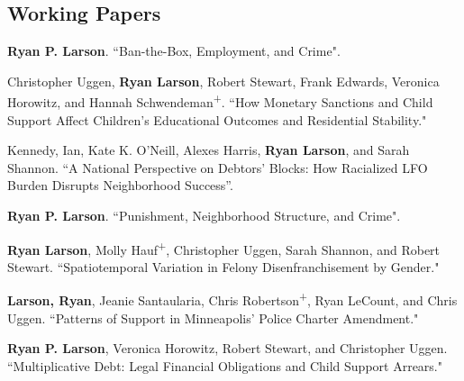 \documentclass[letterpaper]{article}
\newenvironment{publist}{%
  \begin{list}{}{%
    \setlength{\leftmargin}{0cm}   %
    \setlength{\labelwidth}{2cm}     %
    \setlength{\labelsep}{0.5cm}     %
  }%
}{%
  \end{list}%
}
\begin{document}
\subsection*{Working Papers}
\begin{publist}

\item \textbf{Ryan P. Larson}. ``Ban-the-Box, Employment, and Crime". 

\item Christopher Uggen, \textbf{Ryan Larson}, Robert Stewart, Frank Edwards, Veronica Horowitz, and Hannah Schwendeman\textsuperscript{+}. ``How Monetary Sanctions and Child Support Affect Children's Educational Outcomes and Residential Stability."

\item Kennedy, Ian, Kate K. O’Neill, Alexes Harris, \textbf{Ryan Larson}, and Sarah Shannon. “A National Perspective on Debtors’ Blocks: How Racialized LFO Burden Disrupts Neighborhood Success”.

\item \textbf{Ryan P. Larson}. ``Punishment, Neighborhood Structure, and Crime".

\item \textbf{Ryan Larson}, Molly Hauf\textsuperscript{+}, Christopher Uggen, Sarah Shannon, and Robert Stewart. ``Spatiotemporal Variation in Felony Disenfranchisement by Gender."


\item \textbf{Larson, Ryan}, Jeanie Santaularia, Chris Robertson\textsuperscript{+}, Ryan LeCount, and Chris Uggen.  ``Patterns of Support in Minneapolis’ Police Charter Amendment." 

\item \textbf{Ryan P. Larson}, Veronica Horowitz, Robert Stewart, and Christopher Uggen. ``Multiplicative Debt: Legal Financial Obligations and Child Support Arrears."




\end{publist}
\end{document}
